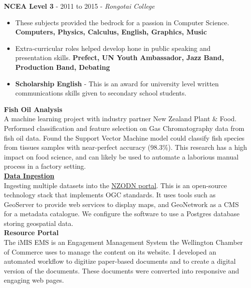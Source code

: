 \documentclass[9pt]{developercv}
\begin{document}
\textbf{NCEA Level 3} - 2011 to 2015 - \emph{Rongotai College}
\begin{itemize}
    \item These subjects provided the bedrock for a passion in Computer Science. \textbf{Computers, Physics, Calculus, English, Graphics, Music}
    \item Extra-curricular roles helped develop hone in public speaking and presentation skills. \textbf{Prefect, UN Youth Ambassador, Jazz Band, Production Band, Debating}
    \item \textbf{Scholarship English} - This is an award for university level written communications skills given to secondary school students. 
\end{itemize}



\textbf{Fish Oil Analysis} \\ 
A machine learning project with industry partner New Zealand Plant \& Food. Performed classification and feature selection on Gas Chromatography data from fish oil data. Found the Support Vector Machine model could classify fish species from tissues samples with near-perfect accuracy (98.3\%). This research has a high impact on food science, and can likely be used to automate a laborious manual process in a factory setting. \\

\textbf{\href{https://github.com/woodRock/psychic-invention}{Data Ingestion}} \\
Ingesting multiple datasets into the \href{https://nzodn.nz/}{NZODN portal}. This is an open-source technology stack that implements OGC standards. It uses tools such as GeoServer to provide web services to display maps, and GeoNetwork as a CMS for a metadata catalogue. We configure the software to use a Postgres database storing geospatial data. \\

\textbf{Resource Portal} \\
The iMIS EMS is an Engagement Management System the Wellington Chamber of Commerce uses to manage the content on its website. I developed an automated workflow to digitize paper-based documents and to create a digital version of the documents. These documents were converted into responsive and engaging web pages. \\
\end{document}
